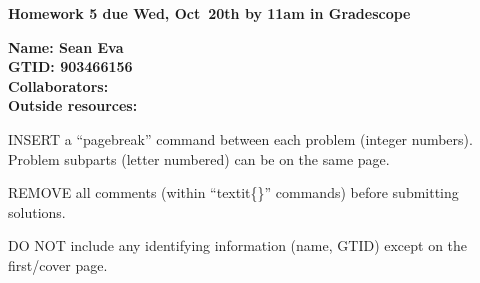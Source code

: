 \documentclass[11pt]{article}
\begin{document}
{\noindent\Large\textbf{Homework 5 due Wed, Oct~20th by 11am in Gradescope}}

\vspace{.25in}

{\large
\noindent
\textbf{Name: Sean Eva} \smallskip \\
\textbf{GTID: 903466156} \smallskip \\
\textbf{Collaborators:} \smallskip \\
\textbf{Outside resources:} \smallskip
}

\pagebreak 


INSERT a ``pagebreak'' command between each problem (integer numbers).
Problem subparts (letter numbered) can be on the same page.

REMOVE all comments (within ``textit\{\}'' commands) before submitting
solutions.

DO NOT include any identifying information (name, GTID) except on the
first/cover page.
\end{document}
